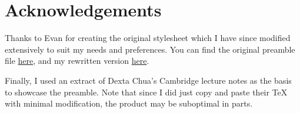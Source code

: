 \section{Acknowledgements}

Thanks to Evan for creating the original stylesheet which I have since modified extensively to suit my needs and preferences. You can find the original preamble file \href{https://github.com/vEnhance/dotfiles/blob/master/texmf/tex/latex/evan/evan.sty}{here}, and my rewritten version \href{https://github.com/sj-bs/Summer2020/blob/master/Handout/Preamble.sty}{here}.\bigskip

Finally, I used an extract of Dexta Chua's Cambridge lecture notes as the basis to showcase the preamble. Note that since I did just copy and paste their TeX with minimal modification, the product may be suboptimal in parts. 

\vfill

\begin{minipage}[t][2cm][b]{\textwidth}
    \centering
    \footnotesize 
\end{minipage}

